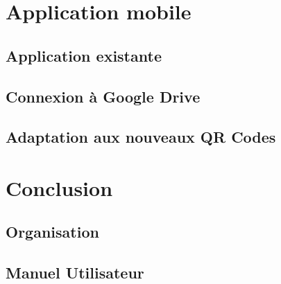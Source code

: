 \documentclass{report}
\begin{document}
\chapter{Application mobile}

	\section{Application existante}
		
		
	\section{Connexion à Google Drive}
		

	\section{Adaptation aux nouveaux QR Codes}
		

\chapter{Conclusion}
	



\addappheadtotoc
\appendixpage

\appendix

\section{Organisation}

	
		
		
\section{Manuel Utilisateur}

	 
\end{document}
